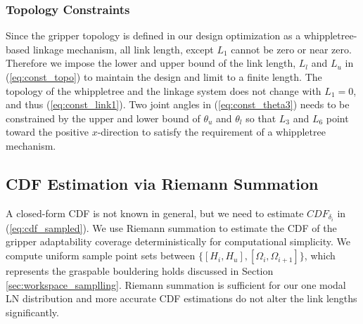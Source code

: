 \documentclass[letterpaper, 10 pt, conference]{ieeeconf}  %
\newcommand{\fig}[1]{Fig.~\ref{#1}}
\newcommand{\eq}[1]{(\ref{#1})}
\begin{document}
\subsubsection{Topology Constraints}
Since the gripper topology is defined in our design optimization as a whippletree-based linkage mechanism, all link length, except $L_1$ cannot be zero or near zero. 
Therefore we impose the lower and upper bound of the link length, $L_l$ and $L_u$ in \eq{eq:const_topo} to maintain the design and limit to a finite length. The topology of the whippletree and the linkage system does not change with $L_1 = 0$, and thus \eq{eq:const_link1}. Two joint angles in \eq{eq:const_theta3} needs to be constrained by the upper and lower bound of $\theta_u$ and $\theta_l$ so that $L_3$ and $L_6$ point toward the positive $x$-direction to satisfy the requirement of a whippletree mechanism. 




\subsection{CDF Estimation via Riemann Summation \label{sec:cdf_delta}}
A closed-form CDF is not known in general, but we need to estimate $CDF_{\delta_i}$ in \eq{eq:cdf_sampled}. %
We use Riemann summation to estimate the CDF of the gripper adaptability coverage deterministically for computational simplicity. We compute uniform sample point sets between $\{[H_i,H_{u}], [\Omega_i,\Omega_{i+1}]\}$, which represents the graspable bouldering holds discussed in Section \ref{sec:workspace_samplling}. Riemann summation is sufficient for our one modal LN distribution and more accurate CDF estimations do not alter the link lengths significantly. 
\end{document}
